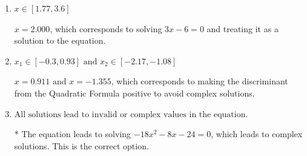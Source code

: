 \documentclass{extbook}[14pt]
\begin{document}
\begin{enumerate}
{\begin{enumerate}[label=\Alph*.]
$x = -1.000$, which corresponds to solving $-4x -4 = 0$ and treating it as a solution to the equation.
\item \( x \in [1.77,3.6] \)

$x = 2.000$, which corresponds to solving $3x -6 = 0$ and treating it as a solution to the equation.
\item \( x_1 \in [-0.3, 0.93] \text{ and } x_2 \in [-2.17,-1.08] \)

$x = 0.911 \text{ and } x = -1.355$, which corresponds to making the discriminant from the Quadratic Formula positive to avoid complex solutions.
\item \( \text{All solutions lead to invalid or complex values in the equation.} \)

* The equation leads to solving $-18x^{2} -8 x -24=0$, which leads to complex solutions. This is the correct option.
\end{enumerate}

}
\end{enumerate}
\end{document}
